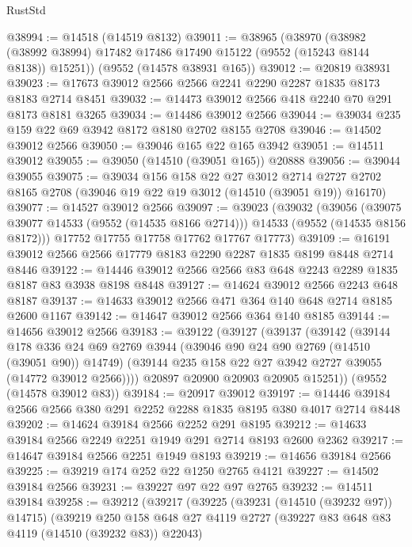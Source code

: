 \begin{lexlean}{RustStd}
\begin{coremodule}
@38994 := @14518 (@14519 @8132)
@39011 := @38965
    (@38970
      (@38982 (@38992 @38994) @17482 @17486 @17490 @15122 (@9552 (@15243 @8144 @8138)) @15251))
    (@9552 (@14578 @38931 @165))
@39012 := @20819 @38931
@39023 := @17673 @39012 @2566 @2566 @2241 @2290 @2287 @1835 @8173 @8183 @2714 @8451
@39032 := @14473 @39012 @2566 @418 @2240 @70 @291 @8173 @8181 @3265
@39034 := @14486 @39012 @2566
@39044 := @39034 @235 @159 @22 @69 @3942 @8172 @8180 @2702 @8155 @2708
@39046 := @14502 @39012 @2566
@39050 := @39046 @165 @22 @165 @3942
@39051 := @14511 @39012
@39055 := @39050 (@14510 (@39051 @165)) @20888
@39056 := @39044 @39055
@39075 := @39034
    @156
    @158
    @22
    @27
    @3012
    @2714
    @2727
    @2702
    @8165
    @2708
    (@39046 @19 @22 @19 @3012 (@14510 (@39051 @19)) @16170)
@39077 := @14527 @39012 @2566
@39097 := @39023
    (@39032
      (@39056
        (@39075 @39077 @14533 (@9552 (@14535 @8166 @2714)))
        @14533
        (@9552 (@14535 @8156 @8172)))
      @17752
      @17755
      @17758
      @17762
      @17767
      @17773)
@39109 := @16191 @39012 @2566 @2566 @17779 @8183 @2290 @2287 @1835 @8199 @8448 @2714 @8446
@39122 := @14446 @39012 @2566 @2566 @83 @648 @2243 @2289 @1835 @8187 @83 @3938 @8198 @8448
@39127 := @14624 @39012 @2566 @2243 @648 @8187
@39137 := @14633 @39012 @2566 @471 @364 @140 @648 @2714 @8185 @2600 @1167
@39142 := @14647 @39012 @2566 @364 @140 @8185
@39144 := @14656 @39012 @2566
@39183 := @39122
    (@39127
      (@39137
        (@39142
          (@39144
            @178
            @336
            @24
            @69
            @2769
            @3944
            (@39046 @90 @24 @90 @2769 (@14510 (@39051 @90)) @14749)
            (@39144 @235 @158 @22 @27 @3942 @2727 @39055 (@14772 @39012 @2566))))
        @20897
        @20900
        @20903
        @20905
        @15251))
    (@9552 (@14578 @39012 @83))
@39184 := @20917 @39012
@39197 := @14446 @39184 @2566 @2566 @380 @291 @2252 @2288 @1835 @8195 @380 @4017 @2714 @8448
@39202 := @14624 @39184 @2566 @2252 @291 @8195
@39212 := @14633 @39184 @2566 @2249 @2251 @1949 @291 @2714 @8193 @2600 @2362
@39217 := @14647 @39184 @2566 @2251 @1949 @8193
@39219 := @14656 @39184 @2566
@39225 := @39219 @174 @252 @22 @1250 @2765 @4121
@39227 := @14502 @39184 @2566
@39231 := @39227 @97 @22 @97 @2765
@39232 := @14511 @39184
@39258 := @39212
    (@39217
      (@39225
        (@39231 (@14510 (@39232 @97)) @14715)
        (@39219
          @250
          @158
          @648
          @27
          @4119
          @2727
          (@39227 @83 @648 @83 @4119 (@14510 (@39232 @83)) @22043)

\end{coremodule}
\end{lexlean}
